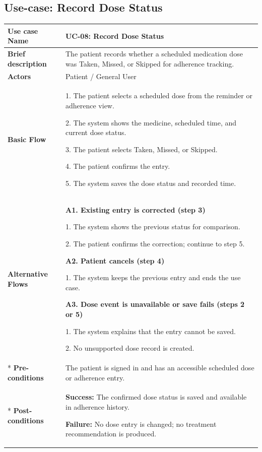 \clearpage
\subsection{Use-case: Record Dose Status}
\label{uc:uc-08}

\begin{longtable}{|p{}|p{}|}
\hline
\textbf{Use case Name} & UC-08: Record Dose Status \\ \hline
\textbf{Brief description} & The patient records whether a scheduled medication dose was Taken, Missed, or Skipped for adherence tracking. \\ \hline
\textbf{Actors} & Patient / General User \\ \hline
\textbf{Basic Flow} &
1. The patient selects a scheduled dose from the reminder or adherence view.\par
2. The system shows the medicine, scheduled time, and current dose status.\par
3. The patient selects Taken, Missed, or Skipped.\par
4. The patient confirms the entry.\par
5. The system saves the dose status and recorded time.
\\ \hline
\textbf{Alternative Flows} &
\textbf{A1. Existing entry is corrected (step 3)}\par
1. The system shows the previous status for comparison.\par
2. The patient confirms the correction; continue to step 5.
\par
\textbf{A2. Patient cancels (step 4)}\par
1. The system keeps the previous entry and ends the use case.
\par
\textbf{A3. Dose event is unavailable or save fails (steps 2 or 5)}\par
1. The system explains that the entry cannot be saved.\par
2. No unsupported dose record is created.
\\* \hline
\textbf{Pre-conditions} & The patient is signed in and has an accessible scheduled dose or adherence entry. \\* \hline
\textbf{Post-conditions} & \textbf{Success:} The confirmed dose status is saved and available in adherence history.\par
\textbf{Failure:} No dose entry is changed; no treatment recommendation is produced. \\ \hline
\end{longtable}

